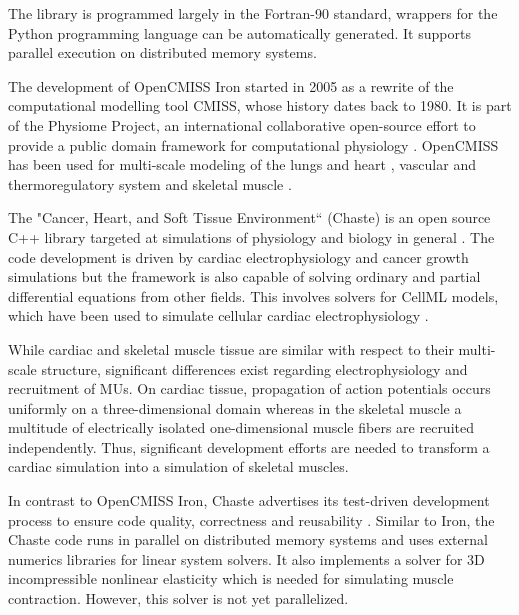 The library is programmed largely in the Fortran-90 standard, wrappers for the Python programming language can be automatically generated. It supports parallel execution on distributed memory systems.

The development of OpenCMISS Iron started in 2005 as a rewrite of the computational modelling tool CMISS, whose history dates back to 1980. It is part of the Physiome Project, an international collaborative open-source effort to provide a public domain framework for computational physiology \cite{Hunter2004}.
OpenCMISS has been used for multi-scale modeling of the lungs and heart \cite{smith2004multiscale}, vascular and thermoregulatory system \cite{ladd2016open,ghadam2020modelling} and skeletal muscle \cite{Heidlauf2013}. 

The "Cancer, Heart, and Soft Tissue Environment`` (Chaste) is an open source C++ library targeted at simulations of physiology and biology in general \cite{Chaste2013}. The code development is driven by cardiac electrophysiology and cancer growth simulations but the framework is also capable of solving  ordinary and partial differential equations from other fields. This involves solvers for CellML models, which have been used to simulate cellular cardiac electrophysiology \cite{ChasteCellML2015}.

While cardiac and skeletal muscle tissue are similar with respect to their multi-scale structure, significant differences exist regarding electrophysiology and recruitment of MUs. On cardiac tissue, propagation of action potentials occurs uniformly on a three-dimensional domain whereas in the skeletal muscle a multitude of electrically isolated one-dimensional muscle fibers are recruited independently.
Thus, significant development efforts are needed to transform a cardiac simulation into a simulation of skeletal muscles.

In contrast to OpenCMISS Iron, Chaste advertises its test-driven development process to ensure code quality, correctness and reusability \cite{Chaste2009}. Similar to Iron, the Chaste code runs in parallel on distributed memory systems and uses external numerics libraries for linear system solvers.
It also implements a solver for 3D incompressible nonlinear elasticity which is needed for simulating muscle contraction. However, this solver is not yet parallelized.

